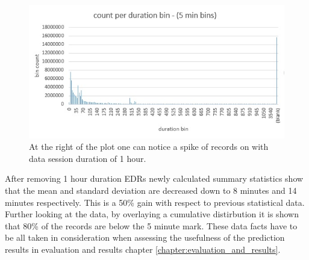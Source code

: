 \documentclass[12pt, a4paper]{report}
\theoremstyle{definition}
\theoremstyle{definition}%
\theoremstyle{definition}%
\theoremstyle{definition}%
\theoremstyle{definition}%
\theoremstyle{definition}%
\begin{document}
\begin{figure}	
	\includegraphics[scale=0.75]{data_session_duration_bin_count.jpg}
	\centering
	\caption{At the right of the plot one can notice a spike of records on with data session duration of 1 hour.}
	\label{fig:data_session_duration_bin_count}
\end{figure}

After removing 1 hour duration EDRs newly calculated summary statistics show that the mean and standard deviation are decreased down to 8 minutes and 14 minutes respectively. This is a 50\% gain with respect to previous statistical data. Further looking at the data, by overlaying a cumulative distirbution it is shown that 80\% of the records are below the 5 minute mark. These data facts have to be all taken in consideration when assessing the usefulness of the prediction results in evaluation and results chapter \ref{chapter:evaluation_and_results}. 



\begin{table}[h]
	\label{table:summary statistics_02}
	\centering
	\caption{Basic summary statistics of main EDR dataset after removing 1 hour duration EDRs.} 
\end{table}
\end{document}
